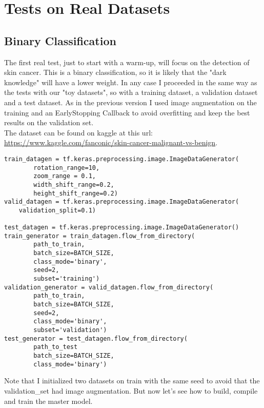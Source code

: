 \section{Tests on Real Datasets}
\subsection{Binary Classification}
The first real test, just to start with a warm-up, will focus on the detection of skin cancer. This is a binary classification, so it is likely that the "dark knowledge" will have a lower weight. In any case I proceeded in the same way as the tests with our "toy datasets", so with a training dataset, a validation dataset and a test dataset. As in the previous version I used image augmentation on the training and an EarlyStopping Callback to avoid overfitting and keep the best results on the validation set.\\
The dataset can be found on kaggle at this url: \url{https://www.kaggle.com/fanconic/skin-cancer-malignant-vs-benign}.


\lstset{language=Python}
\lstset{frame=lines}
\lstset{basicstyle=\footnotesize}
\begin{lstlisting}
train_datagen = tf.keras.preprocessing.image.ImageDataGenerator(
        rotation_range=10, 
        zoom_range = 0.1, 
        width_shift_range=0.2,  
        height_shift_range=0.2)  
valid_datagen = tf.keras.preprocessing.image.ImageDataGenerator(
    validation_split=0.1)

test_datagen = tf.keras.preprocessing.image.ImageDataGenerator()
train_generator = train_datagen.flow_from_directory(
        path_to_train,
        batch_size=BATCH_SIZE,
        class_mode='binary',
        seed=2,
        subset='training')
validation_generator = valid_datagen.flow_from_directory(
        path_to_train,
        batch_size=BATCH_SIZE,
        seed=2,
        class_mode='binary',
        subset='validation')
test_generator = test_datagen.flow_from_directory(
		path_to_test
        batch_size=BATCH_SIZE,
        class_mode='binary')
\end{lstlisting}

Note that I initialized two datasets on train with the same seed to avoid that the validation\_set had image augmentation. But now let's see how to build, compile and train the master model.

